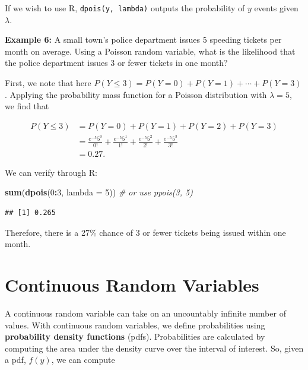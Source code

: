 \documentclass[
]{krantz}
\newenvironment{Shaded}{\begin{snugshade}}{\end{snugshade}}
\newcommand{\CommentTok}[1]{\textcolor[rgb]{0.37,0.37,0.37}{\textit{#1}}}
\newcommand{\DataTypeTok}[1]{\textcolor[rgb]{0.27,0.27,0.27}{#1}}
\newcommand{\DecValTok}[1]{\textcolor[rgb]{0.06,0.06,0.06}{#1}}
\newcommand{\KeywordTok}[1]{\textcolor[rgb]{0.27,0.27,0.27}{\textbf{#1}}}
\newcommand{\NormalTok}[1]{#1}
\newcommand{\OperatorTok}[1]{\textcolor[rgb]{0.43,0.43,0.43}{\textbf{#1}}}
\begin{document}
If we wish to use R, \texttt{dpois(y,\ lambda)} outputs the probability of \(y\) events given \(\lambda\).

\textbf{Example 6:} A small town's police department issues 5 speeding tickets per month on average. Using a Poisson random variable, what is the likelihood that the police department issues 3 or fewer tickets in one month?

First, we note that here \(P(Y \le 3) = P(Y=0) + P(Y=1) + \cdots + P(Y=3)\). Applying the probability mass function for a Poisson distribution with \(\lambda = 5\), we find that

\begin{align*}
 P(Y \le 3) &= P(Y=0) + P(Y=1) + P(Y=2) + P(Y=3) \\
            &= \frac{e^{-5}5^0}{0!} + \frac{e^{-5}5^1}{1!} + \frac{e^{-5}5^2}{2!} + \frac{e^{-5}5^3}{3!}\\
            &= 0.27.
\end{align*}

We can verify through R:

\begin{Shaded}
\begin{Highlighting}[]
\KeywordTok{sum}\NormalTok{(}\KeywordTok{dpois}\NormalTok{(}\DecValTok{0}\OperatorTok{:}\DecValTok{3}\NormalTok{, }\DataTypeTok{lambda =} \DecValTok{5}\NormalTok{))   }\CommentTok{# or use ppois(3, 5)}
\end{Highlighting}
\end{Shaded}

\begin{verbatim}
## [1] 0.265
\end{verbatim}

Therefore, there is a 27\% chance of 3 or fewer tickets being issued within one month.

\hypertarget{continuous-random-variables}{%
\section{Continuous Random Variables}\label{continuous-random-variables}}

A continuous random variable can take on an uncountably infinite number of values. With continuous random variables, we define probabilities using \textbf{probability density functions} (pdfs).  Probabilities are calculated by computing the area under the density curve over the interval of interest. So, given a pdf, \(f(y)\), we can compute
\end{document}
